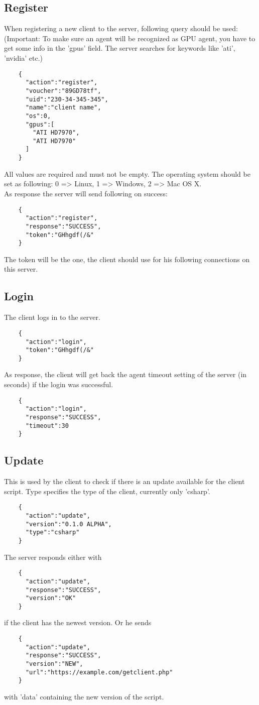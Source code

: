 \documentclass{article}
\begin{document}
	\subsection*{Register}
	When registering a new client to the server, following query should be used:
	(Important: To make sure an agent will be recognized as GPU agent, you have to get some info in the 'gpus' field. The server searches for keywords like 'ati', 'nvidia' etc.)
	\begin{verbatim}
	{
	  "action":"register",
	  "voucher":"89GD78tf",
	  "uid":"230-34-345-345",
	  "name":"client name",
	  "os":0,
	  "gpus":[
	    "ATI HD7970",
	    "ATI HD7970"
	  ]
	}
	\end{verbatim}
	All values are required and must not be empty. The operating system should be set as following: 0 => Linux, 1 => Windows, 2 => Mac OS X.\\
	As response the server will send following on success:
	\begin{verbatim}
	{
	  "action":"register",
	  "response":"SUCCESS",
	  "token":"GHhgdf(/&"
	} 
	\end{verbatim}
	The token will be the one, the client should use for his following connections on this server.
	
	\subsection*{Login}
	The client logs in to the server.
	\begin{verbatim}
	{
	  "action":"login",
	  "token":"GHhgdf(/&"
	}
	\end{verbatim}
	As response, the client will get back the agent timeout setting of the server (in seconds) if the login
	was successful.
	\begin{verbatim}
	{
	  "action":"login",
	  "response":"SUCCESS",
	  "timeout":30
	}
	\end{verbatim}
	
	\subsection*{Update}
	This is used by the client to check if there is an update available for the client script. Type specifies the type of the client, currently only 'csharp'.
	\begin{verbatim}
	{
	  "action":"update",
	  "version":"0.1.0 ALPHA",
	  "type":"csharp"
	}
	\end{verbatim}
	The server responds either with
	\begin{verbatim}
	{
	  "action":"update",
	  "response":"SUCCESS",
	  "version":"OK"
	}
	\end{verbatim}
	if the client has the newest version. Or he sends
	\begin{verbatim}
	{
	  "action":"update",
	  "response":"SUCCESS",
	  "version":"NEW",
	  "url":"https://example.com/getclient.php"
	}
	\end{verbatim}
	with 'data' containing the new version of the script.
	
\end{document}
